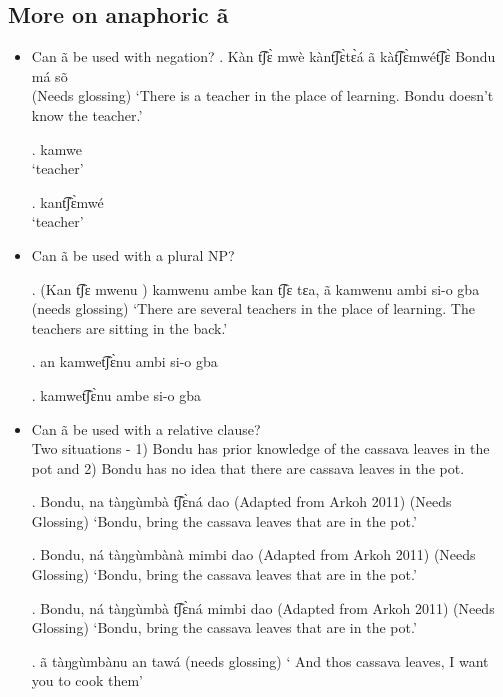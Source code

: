 \documentclass{assets/fieldnotes}
\begin{document}
\subsection{More on anaphoric ã}
\begin{itemize}
    \item Can ã be used with negation?
    \exg. Kàn t͡ʃɛ̀ mwè kànt͡ʃɛ̀tɛ̀á ã kàt͡ʃɛ̀mwét͡ʃɛ̀ Bondu má sõ\\
    (Needs glossing)
    `There is a teacher in the place of learning. Bondu doesn't know the teacher.'

    \exg. kamwe\\
    `teacher'

    \exg. kant͡ʃɛ̀mwé\\
    `teacher'
    

    \item Can ã be used with a plural NP?
   
    \exg. (Kan t͡ʃɛ mwenu ) kamwenu ambe kan t͡ʃɛ tɛa, ã kamwenu ambi si-o gba\\
    (needs glossing)
    `There are several teachers in the place of learning. The teachers are sitting in the back.'

    \exg. an kamwet͡ʃɛ̀nu ambi si-o gba

    \exg. kamwet͡ʃɛ̀nu ambe si-o gba

    \item Can ã be used with a relative clause?\\
    Two situations - 1) Bondu has prior knowledge of the cassava leaves in the pot and 2) Bondu has no idea that there are cassava leaves in the pot.
    
    \exg. Bondu, na tàŋgùmbà t͡ʃɛ̀ná  dao (Adapted from Arkoh 2011)
    (Needs Glossing)
    `Bondu, bring the cassava leaves that are in the pot.'

    \exg. Bondu, ná tàŋgùmbànà mimbi dao (Adapted from Arkoh 2011)
    (Needs Glossing)
    `Bondu, bring the cassava leaves that are in the pot.'

    \exg. Bondu, ná tàŋgùmbà t͡ʃɛ̀ná mimbi dao (Adapted from Arkoh 2011)
    (Needs Glossing)
    `Bondu, bring the cassava leaves that are in the pot.'

\exg. ã tàŋgùmbànu an tawá
(needs glossing)
` And thos cassava leaves, I want you to cook  them'


\end{itemize}
\end{document}
